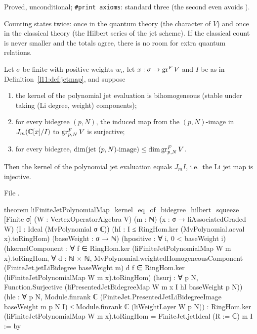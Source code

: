 \begin{status}
Proved, unconditional; \texttt{\#print axioms}: standard three (the second even avoids ).
\end{status}

\begin{physics}
Counting states twice: once in the quantum theory (the character of $V$) and once in the classical theory (the
Hilbert series of the jet scheme). If the classical count is never smaller and the totals agree, there is no room
for extra quantum relations.
\end{physics}

\begin{theorem}\label{l11:thm:freeness}
Let $\sigma$ be finite with positive weights $w_i$, let $x:\sigma\to\operatorname{gr}^FV$ and $I$ be as in
Definition~\ref{l11:def:jetmap}, and suppose
\begin{enumerate}
\item the kernel of the polynomial jet evaluation is bihomogeneous (stable under taking (Li degree, weight)
  components);
\item for every bidegree $(p,N)$, the induced map from the $(p,N)$-image in $J_m({\mathbb{C}}[x]/I)$ to
  $\operatorname{gr}^F_{p,N}V$ is surjective;
\item for every bidegree, $\dim(\text{jet }(p,N)\text{-image})\le\dim\operatorname{gr}^F_{p,N}V$.
\end{enumerate}
Then the kernel of the polynomial jet evaluation equals $J_mI$, i.e.\ the Li jet map is injective.
\end{theorem}
\noindent File .
\begin{leancode}
theorem liFiniteJetPolynomialMap_kernel_eq_of_bidegree_hilbert_squeeze
    [Finite σ]
    (W : VertexOperatorAlgebra V) (m : ℕ)
    (x : σ → liAssociatedGraded W) (I : Ideal (MvPolynomial σ ℂ))
    (hI : I ≤ RingHom.ker (MvPolynomial.aeval x).toRingHom)
    (baseWeight : σ → ℕ) (hpositive : ∀ i, 0 < baseWeight i)
    (hkernelComponent :
      ∀ f ∈ RingHom.ker (liFiniteJetPolynomialMap W m x).toRingHom,
        ∀ d : ℕ × ℕ,
          MvPolynomial.weightedHomogeneousComponent
              (FiniteJet.jetLiBidegree baseWeight m) d f ∈
            RingHom.ker (liFiniteJetPolynomialMap W m x).toRingHom)
    (hsurj : ∀ p N, Function.Surjective
      (liPresentedJetBidegreeMap W m x I hI baseWeight p N))
    (hle : ∀ p N,
      Module.finrank ℂ
          (FiniteJet.PresentedJetLiBidegreeImage baseWeight m p N I) ≤
        Module.finrank ℂ (liWeightLayer W p N)) :
    RingHom.ker (liFiniteJetPolynomialMap W m x).toRingHom =
      FiniteJet.jetIdeal (R := ℂ) m I := by
\end{leancode}

